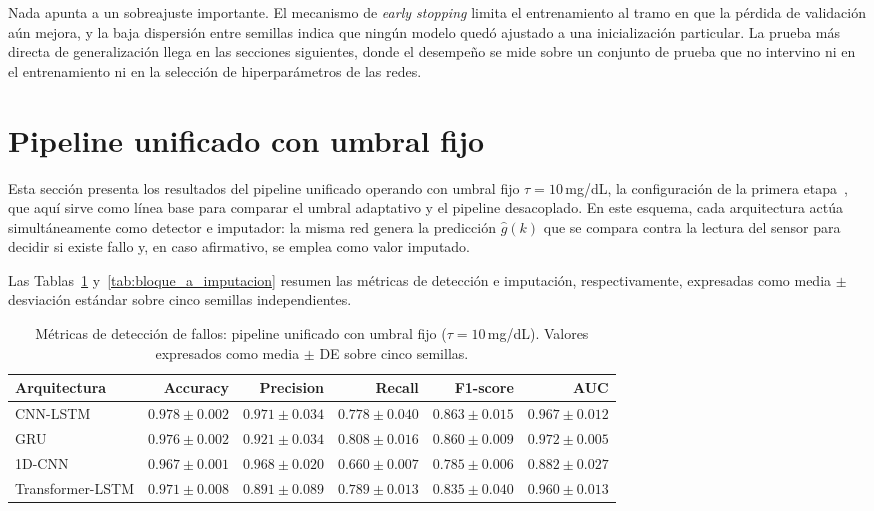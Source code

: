 \documentclass{report}
\begin{document}
Nada apunta a un sobreajuste importante. El mecanismo de \textit{early stopping} limita el entrenamiento al tramo en que la pérdida de validación aún mejora, y la baja dispersión entre semillas indica que ningún modelo quedó ajustado a una inicialización particular. La prueba más directa de generalización llega en las secciones siguientes, donde el desempeño se mide sobre un conjunto de prueba que no intervino ni en el entrenamiento ni en la selección de hiperparámetros de las redes.


\section{Pipeline unificado con umbral fijo}
\label{sec:pipeline_unificado_fijo}

Esta sección presenta los resultados del pipeline unificado operando con umbral fijo $\tau = 10$\,mg/dL, la configuración de la primera etapa~\cite{sanchez2025imputation}, que aquí sirve como línea base para comparar el umbral adaptativo y el pipeline desacoplado. En este esquema, cada arquitectura actúa simultáneamente como detector e imputador: la misma red genera la predicción $\hat{g}(k)$ que se compara contra la lectura del sensor para decidir si existe fallo y, en caso afirmativo, se emplea como valor imputado.

Las Tablas~\ref{tab:bloque_a_deteccion} y~\ref{tab:bloque_a_imputacion} resumen las métricas de detección e imputación, respectivamente, expresadas como media $\pm$ desviación estándar sobre cinco semillas independientes.

\begin{table}[htbp]
\centering
\caption{Métricas de detección de fallos: pipeline unificado con umbral fijo ($\tau = 10$\,mg/dL). Valores expresados como media $\pm$ DE sobre cinco semillas.}
\label{tab:bloque_a_deteccion}
\begin{tabular}{lrrrrr}
\toprule
\textbf{Arquitectura} &
\textbf{Accuracy} & \textbf{Precision} & \textbf{Recall} &
\textbf{F1-score} & \textbf{AUC} \\
\midrule
CNN-LSTM         & $0.978 \pm 0.002$ & $0.971 \pm 0.034$ & $0.778 \pm 0.040$
                 & $0.863 \pm 0.015$ & $0.967 \pm 0.012$ \\
GRU              & $0.976 \pm 0.002$ & $0.921 \pm 0.034$ & $0.808 \pm 0.016$
                 & $0.860 \pm 0.009$ & $0.972 \pm 0.005$ \\
1D-CNN           & $0.967 \pm 0.001$ & $0.968 \pm 0.020$ & $0.660 \pm 0.007$
                 & $0.785 \pm 0.006$ & $0.882 \pm 0.027$ \\
Transformer-LSTM & $0.971 \pm 0.008$ & $0.891 \pm 0.089$ & $0.789 \pm 0.013$
                 & $0.835 \pm 0.040$ & $0.960 \pm 0.013$ \\
\bottomrule
\end{tabular}
\end{table}
\end{document}
